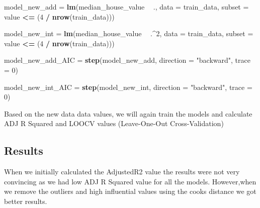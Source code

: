 \documentclass[
]{article}
\newenvironment{Shaded}{\begin{snugshade}}{\end{snugshade}}
\newcommand{\DataTypeTok}[1]{\textcolor[rgb]{0.13,0.29,0.53}{#1}}
\newcommand{\DecValTok}[1]{\textcolor[rgb]{0.00,0.00,0.81}{#1}}
\newcommand{\KeywordTok}[1]{\textcolor[rgb]{0.13,0.29,0.53}{\textbf{#1}}}
\newcommand{\NormalTok}[1]{#1}
\newcommand{\OperatorTok}[1]{\textcolor[rgb]{0.81,0.36,0.00}{\textbf{#1}}}
\newcommand{\StringTok}[1]{\textcolor[rgb]{0.31,0.60,0.02}{#1}}
\begin{document}
\begin{Shaded}
\begin{Highlighting}[]
\NormalTok{model_new_add =}\StringTok{  }\KeywordTok{lm}\NormalTok{(median_house_value }\OperatorTok{~}\StringTok{ }\NormalTok{., }\DataTypeTok{data =}\NormalTok{ train_data, }\DataTypeTok{subset =}\NormalTok{ value }\OperatorTok{<=}\StringTok{ }\NormalTok{(}\DecValTok{4} \OperatorTok{/}\StringTok{ }\KeywordTok{nrow}\NormalTok{(train_data)))}

\NormalTok{model_new_int =}\StringTok{  }\KeywordTok{lm}\NormalTok{(median_house_value }\OperatorTok{~}\StringTok{ }\NormalTok{.}\OperatorTok{^}\DecValTok{2}\NormalTok{, }\DataTypeTok{data =}\NormalTok{ train_data, }\DataTypeTok{subset =}\NormalTok{ value }\OperatorTok{<=}\StringTok{ }\NormalTok{(}\DecValTok{4} \OperatorTok{/}\StringTok{ }\KeywordTok{nrow}\NormalTok{(train_data)))}

\NormalTok{model_new_add_AIC =}\StringTok{ }\KeywordTok{step}\NormalTok{(model_new_add, }\DataTypeTok{direction =} \StringTok{"backward"}\NormalTok{, }\DataTypeTok{trace =} \DecValTok{0}\NormalTok{)}

\NormalTok{model_new_int_AIC =}\StringTok{ }\KeywordTok{step}\NormalTok{(model_new_int, }\DataTypeTok{direction =} \StringTok{"backward"}\NormalTok{, }\DataTypeTok{trace =} \DecValTok{0}\NormalTok{)}
\end{Highlighting}
\end{Shaded}

Based on the new data data values, we will again train the models and
calculate ADJ R Squared and LOOCV values (Leave-One-Out
Cross-Validation)

\hypertarget{results}{%
\subsection{Results}\label{results}}

When we initially calculated the AdjustedR2 value the results were not
very convincing as we had low ADJ R Squared value for all the models.
However,when we remove the outliers and high influential values using
the cooks distance we got better results.
\end{document}
